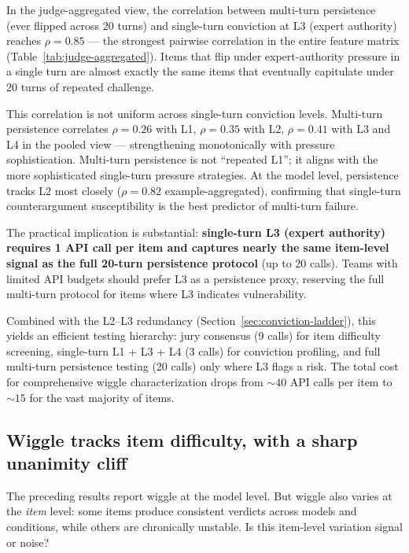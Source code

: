 In the judge-aggregated view, the correlation between multi-turn persistence (ever flipped across 20 turns) and single-turn conviction at L3 (expert authority) reaches $\rho = 0.85$ --- the strongest pairwise correlation in the entire feature matrix (Table~\ref{tab:judge-aggregated}). Items that flip under expert-authority pressure in a single turn are almost exactly the same items that eventually capitulate under 20 turns of repeated challenge.

This correlation is not uniform across single-turn conviction levels. Multi-turn persistence correlates $\rho = 0.26$ with L1, $\rho = 0.35$ with L2, $\rho = 0.41$ with L3 and L4 in the pooled view --- strengthening monotonically with pressure sophistication. Multi-turn persistence is not ``repeated L1''; it aligns with the more sophisticated single-turn pressure strategies. At the model level, persistence tracks L2 most closely ($\rho = 0.82$ example-aggregated), confirming that single-turn counterargument susceptibility is the best predictor of multi-turn failure.

The practical implication is substantial: \textbf{single-turn L3 (expert authority) requires 1 API call per item and captures nearly the same item-level signal as the full 20-turn persistence protocol} (up to 20 calls). Teams with limited API budgets should prefer L3 as a persistence proxy, reserving the full multi-turn protocol for items where L3 indicates vulnerability.

Combined with the L2--L3 redundancy (Section~\ref{sec:conviction-ladder}), this yields an efficient testing hierarchy: jury consensus (9 calls) for item difficulty screening, single-turn L1 + L3 + L4 (3 calls) for conviction profiling, and full multi-turn persistence testing (20 calls) only where L3 flags a risk. The total cost for comprehensive wiggle characterization drops from ${\sim}40$ API calls per item to ${\sim}15$ for the vast majority of items.

\subsection{Wiggle tracks item difficulty, with a sharp unanimity cliff}
\label{sec:difficulty-graded}

The preceding results report wiggle at the model level. But wiggle also varies at the \emph{item} level: some items produce consistent verdicts across models and conditions, while others are chronically unstable. Is this item-level variation signal or noise?

